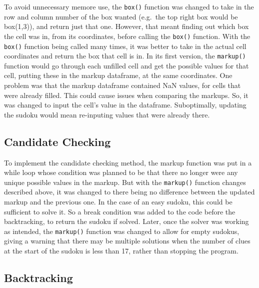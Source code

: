 \documentclass[12pt]{report} %
\begin{document}
To avoid unnecessary memore use, the \texttt{box()} function was changed to take in the row and column number of the box wanted (e.g.\ the top right box would be box(1,3)), and return just that one. However, that meant finding out which box the cell was in, from its coordinates, before calling the \texttt{box()} function. With the \texttt{box()} function being called many times, it was better to take in the actual cell coordinates and return the box that cell is in.
In its first version, the \texttt{markup()} function would go through each unfilled cell and get the possible values for that cell, putting these in the markup dataframe, at the same coordinates. One problem was that the markup dataframe contained NaN values, for cells that were already filled. This could cause issues when comparing the markups. So, it was changed to input the cell's value in the dataframe. Suboptimally, updating the sudoku would mean re-inputing values that were already there.

\subsection{Candidate Checking}

To implement the candidate checking method, the markup function was put in a while loop whose condition was planned to be that there no longer were any unique possible values in the markup. But with the \texttt{markup()} function changes described above, it was changed to there being no difference between the updated markup and the previous one. In the case of an easy sudoku, this could be sufficient to solve it. So a break condition was added to the code before the backtracking, to return the sudoku if solved. Later, once the solver was working as intended, the \texttt{markup()} function was changed to allow for empty sudokus, giving a warning that there may be multiple solutions when the number of clues at the start of the sudoku is less than 17\cite{cornell_sudoku2}, rather than stopping the program.

\subsection{Backtracking}
\end{document}
